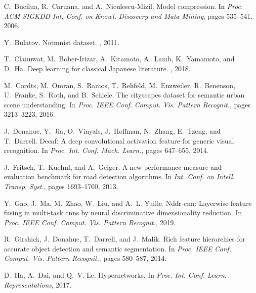 \documentclass[10pt,twocolumn,letterpaper]{article}
\begin{document}
{\small
\balance

\begin{thebibliography}{10}\itemsep=-1pt

C.~Bucilua, R.~Caruana, and A.~Niculescu-Mizil.
\newblock Model compression.
\newblock In {\em Proc. ACM SIGKDD Int. Conf. on Knowl. Discovery and Mata
  Mining}, pages 535--541, 2006.

Y.~Bulatov.
\newblock Notmnist dataset.
, 2011.

T.~Clanuwat, M.~Bober-Irizar, A.~Kitamoto, A.~Lamb, K.~Yamamoto, and D.~Ha.
\newblock Deep learning for classical {J}apanese literature.
, 2018.

M.~Cordts, M.~Omran, S.~Ramos, T.~Rehfeld, M.~Enzweiler, R.~Benenson,
  U.~Franke, S.~Roth, and B.~Schiele.
\newblock The cityscapes dataset for semantic urban scene understanding.
\newblock In {\em Proc. IEEE Conf. Comput. Vis. Pattern Recognit.}, pages
  3213--3223, 2016.

J.~Donahue, Y.~Jia, O.~Vinyals, J.~Hoffman, N.~Zhang, E.~Tzeng, and T.~Darrell.
\newblock Decaf: A deep convolutional activation feature for generic visual
  recognition.
\newblock In {\em Proc. Int. Conf. Mach. Learn.}, pages 647--655, 2014.

J.~Fritsch, T.~Kuehnl, and A.~Geiger.
\newblock A new performance measure and evaluation benchmark for road detection
  algorithms.
\newblock In {\em Int. Conf. on Intell. Transp. Syst.}, pages 1693--1700, 2013.

Y.~Gao, J.~Ma, M.~Zhao, W.~Liu, and A.~L. Yuille.
\newblock Nddr-cnn: Layerwise feature fusing in multi-task cnns by neural
  discriminative dimensionality reduction.
\newblock In {\em Proc. IEEE Conf. Comput. Vis. Pattern Recognit.}, 2019.

R.~Girshick, J.~Donahue, T.~Darrell, and J.~Malik.
\newblock Rich feature hierarchies for accurate object detection and semantic
  segmentation.
\newblock In {\em Proc. IEEE Conf. Comput. Vis. Pattern Recognit.}, pages
  580--587, 2014.

D.~Ha, A.~Dai, and Q.~V. Le.
\newblock Hypernetworks.
\newblock In {\em Proc. Int. Conf. Learn. Representations}, 2017.


\end{thebibliography}}
\end{document}
